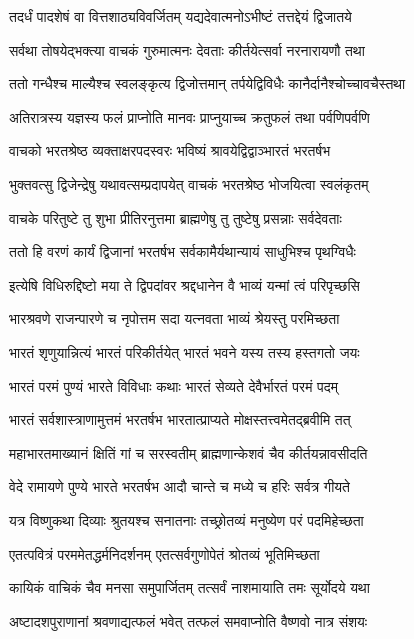\twolineshloka
{तदर्धं पादशेषं वा वित्तशाठ्यविवर्जितम्}
{यद्यदेवात्मनोऽभीष्टं तत्तद्देयं द्विजातये}


\twolineshloka
{सर्वथा तोषयेद्भक्त्या वाचकं गुरुमात्मनः}
{देवताः कीर्तयेत्सर्वा नरनारायणौ तथा}


\twolineshloka
{ततो गन्धैश्च माल्यैश्च स्वलङ्कृत्य द्विजोत्तमान्}
{तर्पयेद्विविधैः कानैर्दानैश्चोच्चावचैस्तथा}


\twolineshloka
{अतिरात्रस्य यज्ञस्य फलं प्राप्नोति मानवः}
{प्राप्नुयाच्च क्रतुफलं तथा पर्वणिपर्वणि}


\twolineshloka
{वाचको भरतश्रेष्ठ व्यक्ताक्षरपदस्वरः}
{भविष्यं श्रावयेद्विद्वाञ्भारतं भरतर्षभ}


\twolineshloka
{भुक्तवत्सु द्विजेन्द्रेषु यथावत्सम्प्रदापयेत्}
{वाचकं भरतश्रेष्ठ भोजयित्वा स्वलंकृतम्}


\twolineshloka
{वाचके परितुष्टे तु शुभा प्रीतिरनुत्तमा}
{ब्राह्मणेषु तु तुष्टेषु प्रसन्नाः सर्वदेवताः}


\twolineshloka
{ततो हि वरणं कार्यं द्विजानां भरतर्षभ}
{सर्वकामैर्यथान्यायं साधुभिश्च पृथग्विधैः}


\twolineshloka
{इत्येषि विधिरुद्दिष्टो मया ते द्विपदांवर}
{श्रद्दधानेन वै भाव्यं यन्मां त्वं परिपृच्छसि}


\twolineshloka
{भारश्रवणे राजन्पारणे च नृपोत्तम}
{सदा यत्नवता भाव्यं श्रेयस्तु परमिच्छता}


\twolineshloka
{भारतं शृणुयान्नित्यं भारतं परिकीर्तयेत्}
{भारतं भवने यस्य तस्य हस्तगतो जयः}


\twolineshloka
{भारतं परमं पुण्यं भारते विविधाः कथाः}
{भारतं सेव्यते देवैर्भारतं परमं पदम्}


\twolineshloka
{भारतं सर्वशास्त्राणामुत्तमं भरतर्षभ}
{भारतात्प्राप्यते मोक्षस्तत्त्वमेतद्ब्रवीमि तत्}


\twolineshloka
{महाभारतमाख्यानं क्षितिं गां च सरस्वतीम्}
{ब्राह्मणान्केशवं चैव कीर्तयन्नावसीदति}


\twolineshloka
{वेदे रामायणे पुण्ये भारते भरतर्षभ}
{आदौ चान्ते च मध्ये च हरिः सर्वत्र गीयते}


\twolineshloka
{यत्र विष्णुकथा दिव्याः श्रुतयश्च सनातनाः}
{तच्छ्रोतव्यं मनुष्येण परं पदमिहेच्छता}


\twolineshloka
{एतत्पवित्रं परममेतद्धर्मनिदर्शनम्}
{एतत्सर्वगुणोपेतं श्रोतव्यं भूतिमिच्छता}


\twolineshloka
{कायिकं वाचिकं चैव मनसा समुपार्जितम्}
{तत्सर्वं नाशमायाति तमः सूर्योदये यथा}


\twolineshloka
{अष्टादशपुराणानां श्रवणाद्यत्फलं भवेत्}
{तत्फलं समवाप्नोति वैष्णवो नात्र संशयः}


